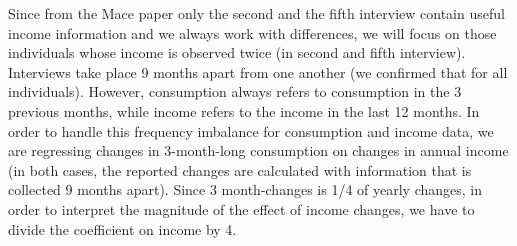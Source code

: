 \documentclass[12pt,a4paper]{article}
\begin{document}
Since from the Mace paper only the second and the fifth interview contain useful income information and we always work with differences, we will focus on those individuals whose income is observed twice (in second and fifth interview). \\

Interviews take place 9 months apart from one another (we confirmed that for all individuals). However, consumption always refers to consumption in the 3 previous months, while income refers to the income in the last 12 months. In order to handle this frequency imbalance for consumption and income data, we are regressing changes in 3-month-long consumption on changes in annual income (in both cases, the reported changes are calculated with information that is collected 9 months apart). Since 3 month-changes is 1/4 of yearly changes, in order to interpret the magnitude of the effect of income changes, we have to divide the coefficient on income by 4.\\
\end{document}
